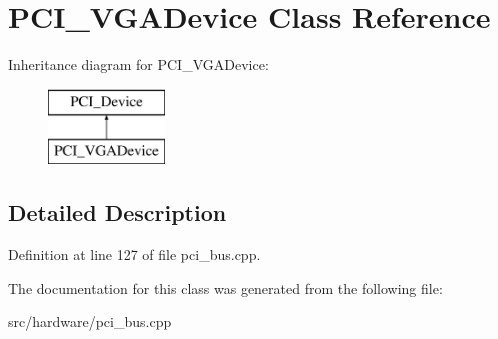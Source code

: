 \hypertarget{classPCI__VGADevice}{\section{P\-C\-I\-\_\-\-V\-G\-A\-Device Class Reference}
\label{classPCI__VGADevice}
}
Inheritance diagram for P\-C\-I\-\_\-\-V\-G\-A\-Device\-:\begin{figure}[H]
\begin{center}
\leavevmode
\includegraphics[height=2.000000cm]{classPCI__VGADevice}
\end{center}
\end{figure}


\subsection{Detailed Description}


Definition at line 127 of file pci\-\_\-bus.\-cpp.



The documentation for this class was generated from the following file\-:\begin{DoxyCompactItemize}
\item 
src/hardware/pci\-\_\-bus.\-cpp\end{DoxyCompactItemize}
